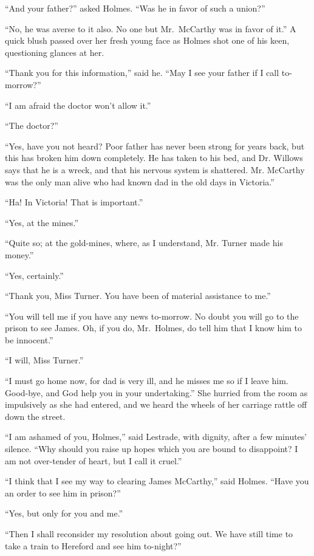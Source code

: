 “And your father?” asked Holmes. “Was he in favor of
such a union?”

“No, he was averse to it also. No one but Mr.~McCarthy
was in favor of it.” A quick blush passed over her fresh
young face as Holmes shot one of his keen, questioning
glances at her.

“Thank you for this information,” said he. “May I see
your father if I call to-morrow?”

“I am afraid the doctor won’t allow it.”

“The doctor?”

“Yes, have you not heard? Poor father has never been
strong for years back, but this has broken him down completely.
He has taken to his bed, and Dr. Willows says that
he is a wreck, and that his nervous system is shattered. Mr.
McCarthy was the only man alive who had known dad in the
old days in Victoria.”

“Ha! In Victoria! That is important.”

“Yes, at the mines.”

“Quite so; at the gold-mines, where, as I understand, Mr.
Turner made his money.”

“Yes, certainly.”

“Thank you, Miss Turner. You have been of material
assistance to me.”

“You will tell me if you have any news to-morrow. No
doubt you will go to the prison to see James. Oh, if you do,
Mr.~Holmes, do tell him that I know him to be innocent.”

“I will, Miss Turner.”

“I must go home now, for dad is very ill, and he misses
me so if I leave him. Good-bye, and God help you in your
undertaking.” She hurried from the room as impulsively as
she had entered, and we heard the wheels of her carriage rattle
off down the street.

“I am ashamed of you, Holmes,” said Lestrade, with dignity,
after a few minutes’ silence. “Why should you raise up
hopes which you are bound to disappoint? I am not over-tender
of heart, but I call it cruel.”

“I think that I see my way to clearing James McCarthy,”
said Holmes. “Have you an order to see him in prison?”

“Yes, but only for you and me.”

“Then I shall reconsider my resolution about going out.
We have still time to take a train to Hereford and see him
to-night?”

